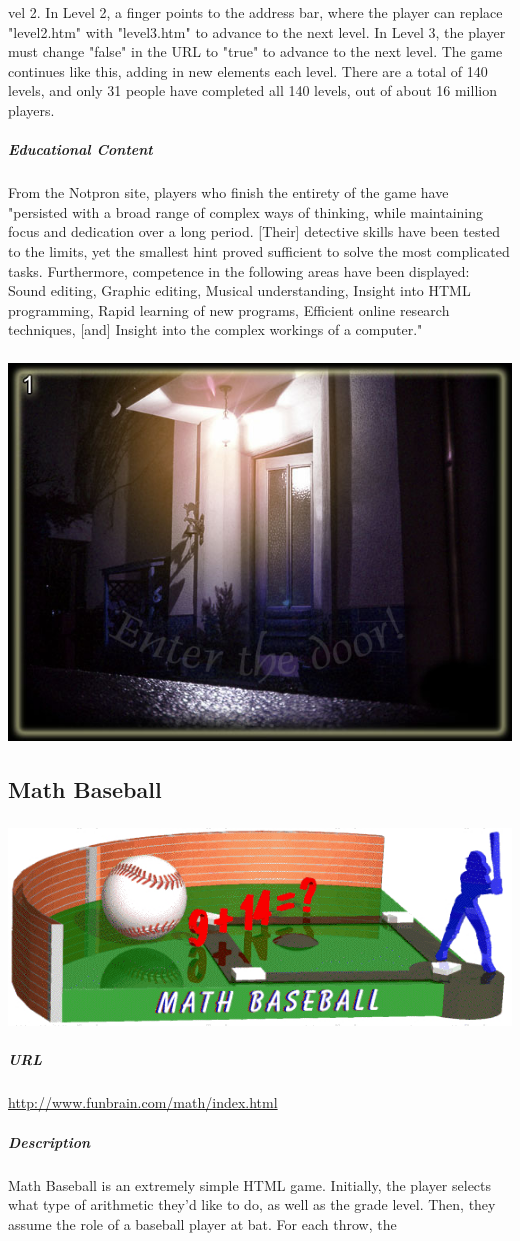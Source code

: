 vel 2. In Level 2, a finger points to the address bar, where the player can replace "level2.htm" with "level3.htm" to advance to the next level. In Level 3, the player must change "false" in the URL to "true" to advance to the next level. The game continues like this, adding in new elements each level. There are a total of 140 levels, and only 31 people have completed all 140 levels, out of about 16 million players.\subparagraph{Educational Content}From the Notpron site, players who finish the entirety of the game have "persisted with a broad range of complex ways of thinking, while maintaining focus and dedication over a long period. [Their] detective skills have been tested to the limits, yet the smallest hint proved sufficient to solve the most complicated tasks. Furthermore, competence in the following areas have been displayed: Sound editing, Graphic editing, Musical understanding, Insight into HTML programming, Rapid learning of new programs, Efficient online research techniques, [and] Insight into the complex workings of a computer."\subparagraph{}\includegraphics[width = \textwidth]{img/notpron_screen.jpg}\subsection{Math Baseball}\subparagraph{}\includegraphics[width = \textwidth]{img/baseball_title.jpg}\subparagraph{URL}\url{http://www.funbrain.com/math/index.html}\subparagraph{Description}Math Baseball is an extremely simple HTML game. Initially, the player selects what type of arithmetic they'd like to do, as well as the grade level. Then, they assume the role of a baseball player at bat. For each throw, the 